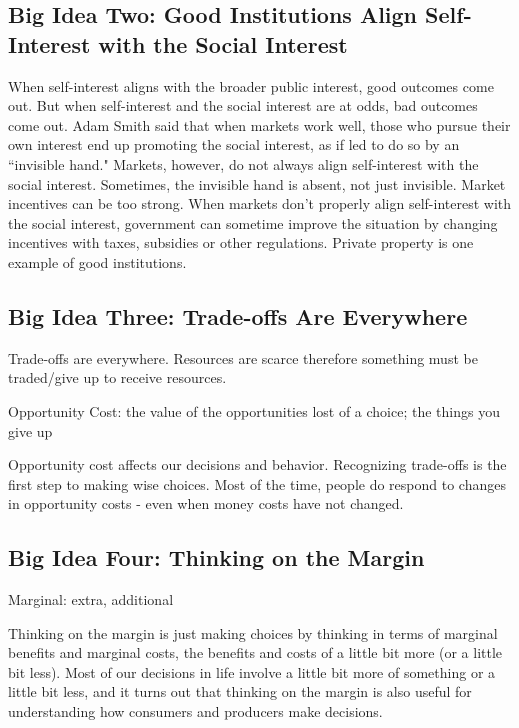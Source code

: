 \documentclass[12pt]{article}
\begin{document}
\subsection{Big Idea Two: Good Institutions Align Self-Interest with the Social Interest} 
When self-interest aligns with the broader public interest, good outcomes come out. But when self-interest and the social interest are at odds, bad outcomes come out. Adam Smith said that when markets work well, those who pursue their own interest end up promoting the social interest, as if led to do so by an ``invisible hand." Markets, however, do not always align self-interest with the social interest. Sometimes, the invisible hand is absent, not just invisible. Market incentives can be too strong. When markets don't properly align self-interest with the social interest, government can sometime improve the situation by changing incentives with taxes, subsidies or other regulations. Private property is one example of good institutions. 

\subsection{Big Idea Three: Trade-offs Are Everywhere} 
Trade-offs are everywhere. Resources are scarce therefore something must be traded/give up to receive resources. 
\begin{definition} Opportunity Cost: the value of the opportunities lost of a choice; the things you give up \end{definition}
Opportunity cost affects our decisions and behavior. Recognizing trade-offs is the first step to making wise choices. Most of the time, people do respond to changes in opportunity costs - even when money costs have not changed. 

\subsection{Big Idea Four: Thinking on the Margin} 
\begin{definition} Marginal: extra, additional \end{definition}
Thinking on the margin is just making choices by thinking in terms of marginal benefits and marginal costs, the benefits and costs of a little bit more (or a little bit less). Most of our decisions in life involve a little bit more of something or a little bit less, and it turns out that thinking on the margin is also useful for understanding how consumers and producers make decisions. 
\end{document}
